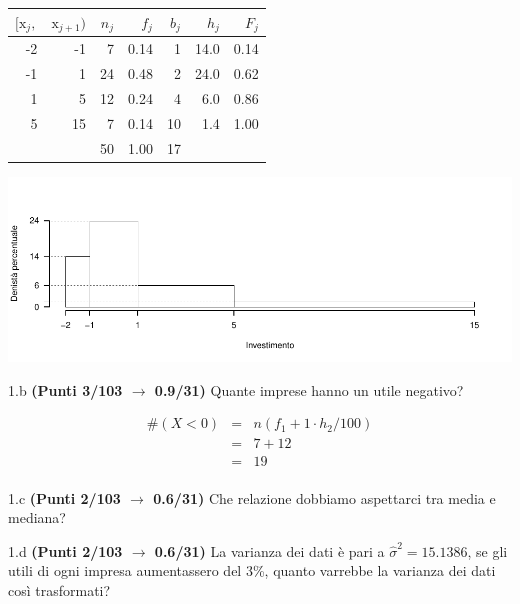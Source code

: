 \documentclass[
  11pt,
]{book}
\theoremstyle{mytheoremstyle}
\theoremstyle{mydefstyle}
\newenvironment{sol}
  {
  \begin{tcolorbox}[enhanced,breakable,arc=0.1mm,boxrule=1pt,colback=white,colframe=iblue,
  title=\bf \fontfamily{lmss}\selectfont \hspace{.5 cm} Soluzione,drop fuzzy shadow]

}{
\end{tcolorbox}
  }
\begin{document}
\begin{sol}

\begin{table}[H]
\centering
\begin{tabular}{rrrrrrr}
\toprule
$[\text{x}_j,$ & $\text{x}_{j+1})$ & $n_j$ & $f_j$ & $b_j$ & $h_j$ & $F_j$\\
\midrule
-2 & -1 & 7 & 0.14 & 1 & 14.0 & 0.14\\
-1 & 1 & 24 & 0.48 & 2 & 24.0 & 0.62\\
1 & 5 & 12 & 0.24 & 4 & 6.0 & 0.86\\
5 & 15 & 7 & 0.14 & 10 & 1.4 & 1.00\\
 &  & 50 & 1.00 & 17 &  & \\
\bottomrule
\end{tabular}
\end{table}

\begin{center}\includegraphics{Esami_passati_con_soluzioni_files/figure-latex/2023-157-1} \end{center}

\end{sol}

1.b \textbf{(Punti 3/103 \(\rightarrow\) 0.9/31)} Quante imprese hanno un utile negativo?

\begin{sol}
\begin{eqnarray*}
  \#(X<0) &=&  n (f_1 + 1\cdot h_2/100)\\
  &=& 7 + 12\\
  &=& 19\\
\end{eqnarray*}

\end{sol}

1.c \textbf{(Punti 2/103 \(\rightarrow\) 0.6/31)} Che relazione dobbiamo aspettarci tra media e mediana?

1.d \textbf{(Punti 2/103 \(\rightarrow\) 0.6/31)} La varianza dei dati è pari a \(\hat\sigma^2=15.1386\), se gli utili di ogni impresa aumentassero del 3\%, quanto varrebbe la varianza dei dati così trasformati?
\end{document}
